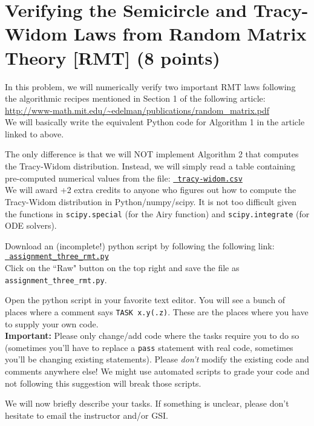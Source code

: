 \documentclass{article}
\begin{document}
\section{Verifying the Semicircle and Tracy-Widom Laws from Random Matrix
Theory [RMT] (8 points)}

In this problem, we will numerically verify two important RMT laws following
the algorithmic recipes mentioned in Section 1 of the following article: \\
\url{http://www-math.mit.edu/~edelman/publications/random_matrix.pdf}\\
We will basically write the equivalent Python code for Algorithm 1 in the article linked to above.

The only difference is that we will NOT implement Algorithm 2 that computes the
Tracy-Widom distribution. Instead, we will simply read a table containing
pre-computed numerical values from the file:
\href{https://github.com/ambujtewari/stats607a-fall2015/blob/master/homeworks/datasets/tracy-widom.csv}{\tt
tracy-widom.csv} \\
We will award +2 extra credits to anyone who figures out how to compute the Tracy-Widom distribution in Python/numpy/scipy.
It is not too difficult given the functions in {\tt scipy.special} (for the Airy function) and {\tt scipy.integrate} (for ODE
solvers).

Download an (incomplete!) python script by following the following
link:\\
\href{https://github.com/ambujtewari/stats607a-fall2015/blob/master/homeworks/assignment_three_rmt.py}{\tt
assignment\_three\_rmt.py} \\
Click on the ``Raw" button on the top right and save the file as {\tt
assignment\_three\_rmt.py}.

Open the python script in your favorite text editor. You will see a bunch of places where a comment says {\tt TASK x.y(.z)}. These are the places where you have to supply your
own code.\\
{\bf Important:} Please only change/add code where the tasks require you to do so (sometimes you'll have to replace a {\tt pass} statement with real code, sometimes you'll be changing existing statements). Please {\em don't} modify the existing code and comments anywhere else! We might use automated scripts to grade your code and not following this suggestion will break those scripts.

We will now briefly describe your tasks. If something is unclear, please don't hesitate to email the instructor and/or GSI.
\end{document}
